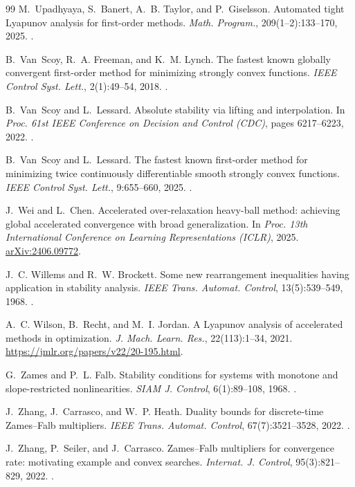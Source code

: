 \documentclass[11pt]{article}
\theoremstyle{definition}
\theoremstyle{remark}
\begin{document}
\begin{thebibliography}{99}
 M.~Upadhyaya, S.~Banert, A.~B. Taylor, and P.~Giselsson. Automated tight Lyapunov analysis for first-order methods. \textit{Math. Program.}, 209(1--2):133--170, 2025. .

 B.~Van~Scoy, R.~A. Freeman, and K.~M. Lynch. The fastest known globally convergent first-order method for minimizing strongly convex functions. \textit{IEEE Control Syst. Lett.}, 2(1):49--54, 2018. .

 B.~Van~Scoy and L.~Lessard. Absolute stability via lifting and interpolation. In \textit{Proc. 61st IEEE Conference on Decision and Control (CDC)}, pages 6217--6223, 2022. .

 B.~Van~Scoy and L.~Lessard. The fastest known first-order method for minimizing twice continuously differentiable smooth strongly convex functions. \textit{IEEE Control Syst. Lett.}, 9:655--660, 2025. .

 J.~Wei and L.~Chen. Accelerated over-relaxation heavy-ball method: achieving global accelerated convergence with broad generalization. In \textit{Proc. 13th International Conference on Learning Representations (ICLR)}, 2025. \href{https://arxiv.org/abs/2406.09772}{arXiv:2406.09772}.

 J.~C. Willems and R.~W. Brockett. Some new rearrangement inequalities having application in stability analysis. \textit{IEEE Trans. Automat. Control}, 13(5):539--549, 1968. .

 A.~C. Wilson, B.~Recht, and M.~I. Jordan. A Lyapunov analysis of accelerated methods in optimization. \textit{J. Mach. Learn. Res.}, 22(113):1--34, 2021. \url{https://jmlr.org/papers/v22/20-195.html}.

 G.~Zames and P.~L. Falb. Stability conditions for systems with monotone and slope-restricted nonlinearities. \textit{SIAM J. Control}, 6(1):89--108, 1968. .

 J.~Zhang, J.~Carrasco, and W.~P. Heath. Duality bounds for discrete-time Zames--Falb multipliers. \textit{IEEE Trans. Automat. Control}, 67(7):3521--3528, 2022{}. .

 J.~Zhang, P.~Seiler, and J.~Carrasco. Zames--Falb multipliers for convergence rate: motivating example and convex searches. \textit{Internat. J. Control}, 95(3):821--829, 2022{}. .

\end{thebibliography}
\end{document}
